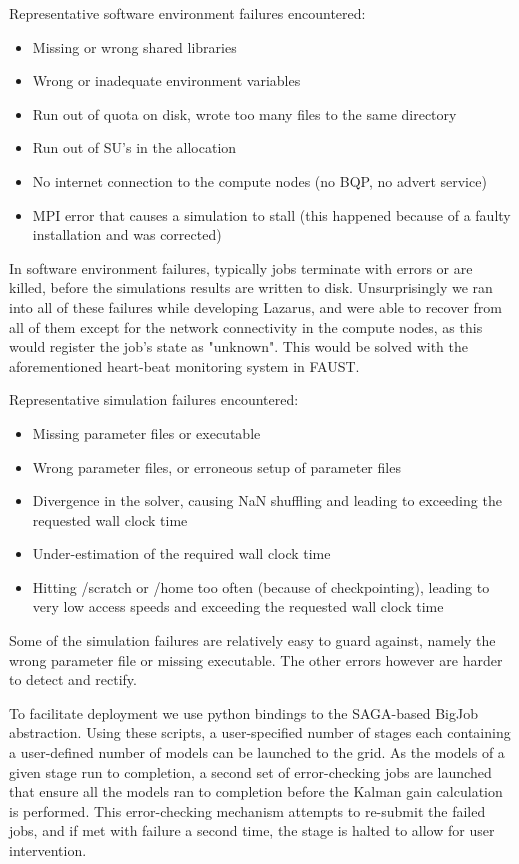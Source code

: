 \documentclass[conference,final]{IEEEtran}
\begin{document}
Representative software environment failures encountered:
\begin{itemize}
\item{Missing or wrong shared libraries}
\item{Wrong or inadequate environment variables}
\item{Run out of quota on disk, wrote too many files to the same directory}
\item{Run out of SU's in the allocation}
\item{No internet connection to the compute nodes (no BQP, no advert service)}
\item{MPI error that causes a simulation to stall (this happened because of a faulty installation and was corrected)}
\end{itemize}
In software environment failures, typically jobs terminate with errors
or are killed, before the simulations results are written to
disk. Unsurprisingly we ran into all of these failures while
developing Lazarus, and were able to recover from all of them except
for the network connectivity in the compute nodes, as this would
register the job's state as "unknown". This would be solved with the
aforementioned heart-beat monitoring system in FAUST.

Representative simulation failures encountered:
\begin{itemize}
\item{Missing parameter files or executable}
\item{Wrong parameter files, or erroneous setup of parameter files}
\item{Divergence in the solver, causing NaN shuffling and leading to exceeding the requested wall clock time}
\item{Under-estimation of the required wall clock time}
\item{Hitting /scratch or /home too often (because of checkpointing), leading to very low access speeds and exceeding the requested wall clock time}
\end{itemize}
Some of the simulation failures are relatively easy to guard against,
namely the wrong parameter file or missing executable. The other errors
however are harder to detect and rectify.

To facilitate deployment we use python bindings to the SAGA-based
BigJob abstraction. Using these scripts, a user-specified number of
stages each containing a user-defined number of models can be launched
to the grid. As the models of a given stage run to completion, a
second set of error-checking jobs are launched that ensure all the
models ran to completion before the Kalman gain calculation is
performed. This error-checking mechanism attempts to re-submit the
failed jobs, and if met with failure a second time, the stage is
halted to allow for user intervention.
\end{document}
